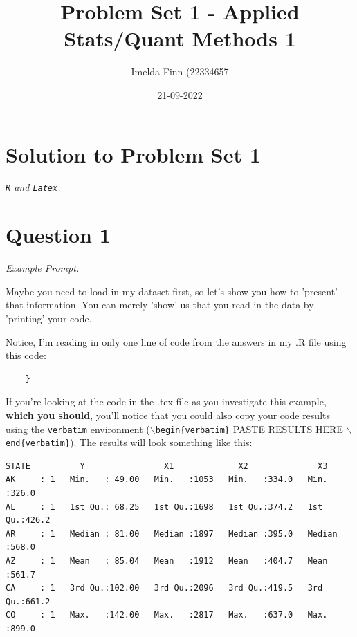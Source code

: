 \documentclass[12pt,letterpaper]{article}
\title{Problem Set 1 - Applied Stats/Quant Methods 1}
\date{21-09-2022}
\author{Imelda Finn (22334657}
\begin{document}
	\maketitle
	
	\section*{Solution to Problem Set 1}

 \textit{ \texttt{R} and \texttt{Latex}.}

\section*{Question 1 }

\textit{Example Prompt.}\\

\vspace{.25cm}

\noindent Maybe you need to load in my dataset first, so let's show you how to 'present' that information. You can merely 'show' us that you read in the data by 'printing' your code. \\

  

\vspace{.25cm}

\noindent Notice, I'm reading in only one line of code from the answers in my .R file using this code: 

\begin{verbatim}
	}
\end{verbatim}

\noindent If you're looking at the code in the .tex file as you investigate this example, \textbf{which you should}, you'll notice that you could also copy your code results using the \texttt{verbatim} environment (\texttt{$\backslash$begin\{verbatim\}} PASTE RESULTS HERE \texttt{$\backslash$end\{verbatim\}}). The results will look something like this:


\begin{verbatim}
STATE          Y                X1             X2              X3       
AK     : 1   Min.   : 49.00   Min.   :1053   Min.   :334.0   Min.   :326.0  
AL     : 1   1st Qu.: 68.25   1st Qu.:1698   1st Qu.:374.2   1st Qu.:426.2  
AR     : 1   Median : 81.00   Median :1897   Median :395.0   Median :568.0  
AZ     : 1   Mean   : 85.04   Mean   :1912   Mean   :404.7   Mean   :561.7  
CA     : 1   3rd Qu.:102.00   3rd Qu.:2096   3rd Qu.:419.5   3rd Qu.:661.2  
CO     : 1   Max.   :142.00   Max.   :2817   Max.   :637.0   Max.   :899.0  
\end{verbatim}
\vspace{.5cm}
\end{document}
